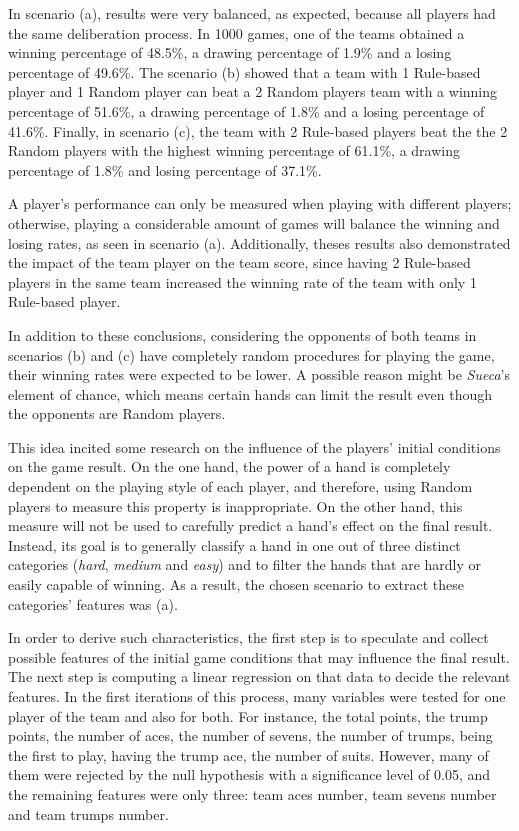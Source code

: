 In scenario (a), results were very balanced, as expected, because all players had the same deliberation process.
In 1000 games, one of the teams obtained a winning percentage of 48.5\%, a drawing percentage of 1.9\% and a losing percentage of 49.6\%.
The scenario (b) showed that a team with 1 Rule-based player and 1 Random player can beat a 2 Random players team with a winning percentage of 51.6\%, a drawing percentage of 1.8\% and a losing percentage of 41.6\%.
Finally, in scenario (c), the team with 2 Rule-based players beat the the 2 Random players with the highest winning percentage of 61.1\%, a drawing percentage of 1.8\% and losing percentage of 37.1\%.

A player's performance can only be measured when playing with different players; otherwise, playing a considerable amount of games will balance the winning and losing rates, as seen in scenario (a).
Additionally, theses results also demonstrated the impact of the team player on the team score, since having 2 Rule-based players in the same team increased the winning rate of the team with only 1 Rule-based player.

In addition to these conclusions, considering the opponents of both teams in scenarios (b) and (c) have completely random procedures for playing the game, their winning rates were expected to be lower.
A possible reason might be \emph{Sueca}'s element of chance, which means certain hands can limit the result even though the opponents are Random players.

This idea incited some research on the influence of the players' initial conditions on the game result.
On the one hand, the power of a hand is completely dependent on the playing style of each player, and therefore, using Random players to measure this property is inappropriate.
On the other hand, this measure will not be used to carefully predict a hand's effect on the final result.
Instead, its goal is to generally classify a hand in one out of three distinct categories (\emph{hard}, \emph{medium} and \emph{easy}) and to filter the hands that are hardly or easily capable of winning.
As a result, the chosen scenario to extract these categories' features was (a).

In order to derive such characteristics, the first step is to speculate and collect possible features of the initial game conditions that may influence the final result.
The next step is computing a linear regression on that data to decide the relevant features.
In the first iterations of this process, many variables were tested for one player of the team and also for both.
For instance, the total points, the trump points, the number of aces, the number of sevens, the number of trumps, being the first to play, having the trump ace, the number of suits.
However, many of them were rejected by the null hypothesis with a significance level of 0.05, and the remaining features were only three: team aces number, team sevens number and team trumps number.


